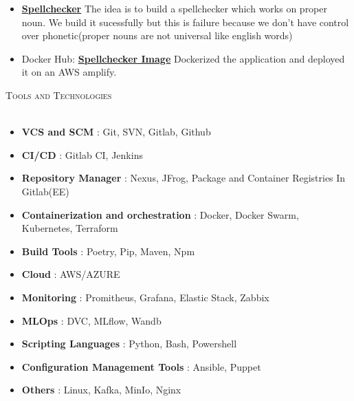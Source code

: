 \documentclass[a4paper]{article}
\newcommand{\lineunder} {
    \vspace*{-8pt} \\
    \hspace*{-18pt} \hrulefill \\
}
\newcommand{\header} [1] {
    {\hspace*{-18pt}\vspace*{6pt} \textsc{#1}}
    \vspace*{-6pt} \lineunder
}
\begin{document}
\begin{itemize} \itemsep 1pt
    \item \href{https://github.com/krushna2500/spellchecker}{\textbf{Spellchecker}}
    The idea is to build a spellchecker which works on proper noun. We build it sucessfully but this is failure because we don't have control over phonetic(proper nouns are not universal like english words)
    \item Docker Hub: \href{https://hub.docker.com/r/krushna2500/spellchecker}{\textbf{Spellchecker Image}} Dockerized the application and deployed it on an AWS amplify.
\end{itemize}
\vspace*{2mm}


\header{Tools and Technologies}
\begin{itemize}
    \item \textbf{VCS and SCM} : Git, SVN, Gitlab, Github
    \item \textbf{CI/CD} : Gitlab CI, Jenkins 
    \item \textbf{Repository Manager} : Nexus, JFrog, Package and Container Registries In Gitlab(EE)
    \item \textbf{Containerization and orchestration} : Docker, Docker Swarm, Kubernetes, Terraform
    \item \textbf{Build Tools} : Poetry, Pip, Maven, Npm
    \item \textbf{Cloud} : AWS/AZURE
    \item \textbf{Monitoring} : Promitheus, Grafana, Elastic Stack, Zabbix 
    \item \textbf{MLOps} : DVC, MLflow, Wandb
    \item \textbf{Scripting Languages} : Python, Bash, Powershell
    \item \textbf{Configuration Management Tools} : Ansible, Puppet
    \item \textbf{Others} : Linux, Kafka, MinIo, Nginx
\end{itemize}
\end{document}
